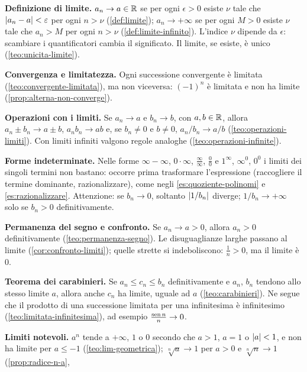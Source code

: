 \begin{puntichiave}
\item \textbf{Definizione di limite.} $a_{n}\to a\in\mathbb{R}$ se per ogni $\epsilon>0$ esiste
$\nu$ tale che $\lvert a_{n}-a\rvert<\varepsilon$ per ogni $n>\nu$ (\cref{def:limite}); $a_{n}\to+\infty$
se per ogni $M>0$ esiste $\nu$ tale che $a_{n}>M$ per ogni $n>\nu$
(\cref{def:limite-infinito}). L'indice $\nu$ dipende da $\epsilon$: scambiare i
quantificatori cambia il significato. Il limite, se esiste, è unico
(\cref{teo:unicita-limite}).
\item \textbf{Convergenza e limitatezza.} Ogni successione convergente è limitata
(\cref{teo:convergente-limitata}), ma non viceversa: $(-1)^{n}$ è limitata e non ha
limite (\cref{prop:alterna-non-converge}).
\item \textbf{Operazioni con i limiti.} Se $a_{n}\to a$ e $b_{n}\to b$, con $a,b\in\mathbb{R}$,
allora $a_{n}\pm b_{n}\to a\pm b$, $a_{n}b_{n}\to ab$ e, se $b_{n}\neq0$ e $b\neq0$,
$a_{n}/b_{n}\to a/b$ (\cref{teo:operazioni-limiti}). Con limiti infiniti valgono regole
analoghe (\cref{teo:operazioni-infinite}).
\item \textbf{Forme indeterminate.} Nelle forme $\infty-\infty$, $0\cdot\infty$,
$\frac\infty\infty$, $\frac00$ e $1^{\infty}$, $\infty^{0}$, $0^{0}$ i limiti dei
singoli termini non bastano: occorre prima trasformare l'espressione (raccogliere il
termine dominante, razionalizzare), come negli \cref{es:quoziente-polinomi} e
\cref{es:razionalizzare}. Attenzione: se $b_{n}\to0$, soltanto $\lvert 1/b_{n}\rvert$ diverge;
$1/b_{n}\to+\infty$ solo se $b_{n}>0$ definitivamente.
\item \textbf{Permanenza del segno e confronto.} Se $a_{n}\to a>0$, allora $a_{n}>0$
definitivamente (\cref{teo:permanenza-segno}). Le disuguaglianze larghe passano al
limite (\cref{cor:confronto-limiti}); quelle strette si indeboliscono: $\frac1n>0$, ma il
limite è $0$.
\item \textbf{Teorema dei carabinieri.} Se $a_{n}\le c_{n}\le b_{n}$ definitivamente e
$a_{n}$, $b_{n}$ tendono allo stesso limite $a$, allora anche $c_{n}$ ha limite, uguale
ad $a$ (\cref{teo:carabinieri}). Ne segue che il prodotto di una successione limitata per
una infinitesima è infinitesimo (\cref{teo:limitata-infinitesima}), ad esempio
$\frac{\operatorname{sen} n}{n}\to0$.
\item \textbf{Limiti notevoli.} $a^{n}$ tende a $+\infty$, $1$ o $0$ secondo che $a>1$,
$a=1$ o $\lvert a\rvert<1$, e non ha limite per $a\le-1$ (\cref{teo:lim-geometrica});
$\sqrt[n]a\to1$ per $a>0$ e $\sqrt[n]n\to1$ (\cref{prop:radice-n-a},

\end{puntichiave}
